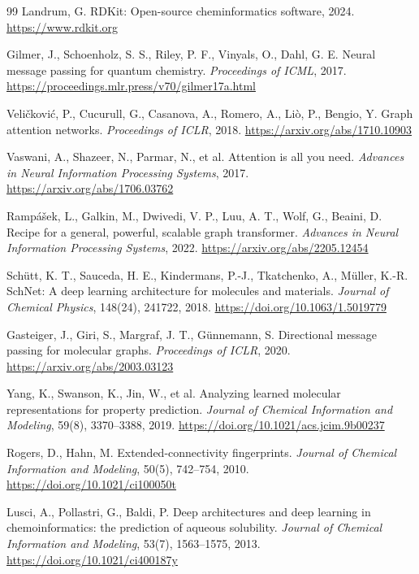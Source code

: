 \documentclass[11pt]{article}
\theoremstyle{definition}
\begin{document}
\begin{thebibliography}{99}
 Landrum, G. RDKit: Open-source cheminformatics software, 2024. \url{https://www.rdkit.org}

 Gilmer, J., Schoenholz, S. S., Riley, P. F., Vinyals, O., Dahl, G. E. Neural message passing for quantum chemistry. \textit{Proceedings of ICML}, 2017. \url{https://proceedings.mlr.press/v70/gilmer17a.html}

 Veličković, P., Cucurull, G., Casanova, A., Romero, A., Liò, P., Bengio, Y. Graph attention networks. \textit{Proceedings of ICLR}, 2018. \url{https://arxiv.org/abs/1710.10903}

 Vaswani, A., Shazeer, N., Parmar, N., et al. Attention is all you need. \textit{Advances in Neural Information Processing Systems}, 2017. \url{https://arxiv.org/abs/1706.03762}

 Rampášek, L., Galkin, M., Dwivedi, V. P., Luu, A. T., Wolf, G., Beaini, D. Recipe for a general, powerful, scalable graph transformer. \textit{Advances in Neural Information Processing Systems}, 2022. \url{https://arxiv.org/abs/2205.12454}

 Schütt, K. T., Sauceda, H. E., Kindermans, P.-J., Tkatchenko, A., Müller, K.-R. SchNet: A deep learning architecture for molecules and materials. \textit{Journal of Chemical Physics}, 148(24), 241722, 2018. \url{https://doi.org/10.1063/1.5019779}

 Gasteiger, J., Giri, S., Margraf, J. T., Günnemann, S. Directional message passing for molecular graphs. \textit{Proceedings of ICLR}, 2020. \url{https://arxiv.org/abs/2003.03123}

 Yang, K., Swanson, K., Jin, W., et al. Analyzing learned molecular representations for property prediction. \textit{Journal of Chemical Information and Modeling}, 59(8), 3370--3388, 2019. \url{https://doi.org/10.1021/acs.jcim.9b00237}

 Rogers, D., Hahn, M. Extended-connectivity fingerprints. \textit{Journal of Chemical Information and Modeling}, 50(5), 742--754, 2010. \url{https://doi.org/10.1021/ci100050t}

 Lusci, A., Pollastri, G., Baldi, P. Deep architectures and deep learning in chemoinformatics: the prediction of aqueous solubility. \textit{Journal of Chemical Information and Modeling}, 53(7), 1563--1575, 2013. \url{https://doi.org/10.1021/ci400187y}


\end{thebibliography}
\end{document}
